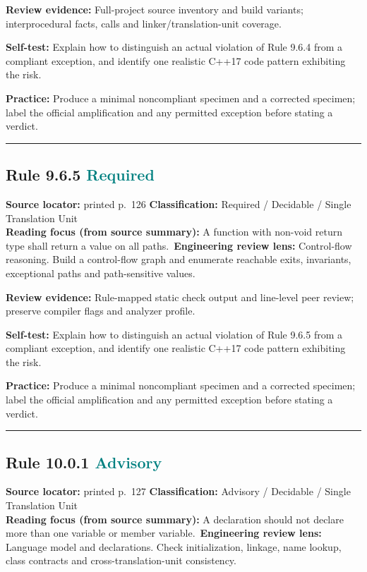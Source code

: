 \documentclass[10pt,letterpaper]{article}
\begin{document}
\textbf{Review evidence:} Full-project source inventory and build variants; interprocedural facts, calls and linker/translation-unit coverage.

\textbf{Self-test:} Explain how to distinguish an actual violation of Rule 9.6.4 from a compliant exception, and identify one realistic C++17 code pattern exhibiting the risk.\par
\textbf{Practice:} Produce a minimal noncompliant specimen and a corrected specimen; label the official amplification and any permitted exception before stating a verdict.
\smallskip\hrule\smallskip
\subsection*{Rule 9.6.5 \enspace \texorpdfstring{\small\textcolor{teal}{Required}}{Required}}
\noindent\textbf{Source locator:} printed p.~126 \quad\textbf{Classification:} Required / Decidable / Single Translation Unit\\
\textbf{Reading focus (from source summary):} A function with non-void return type shall return a value on all paths.\
\textbf{Engineering review lens:} Control-flow reasoning. Build a control-flow graph and enumerate reachable exits, invariants, exceptional paths and path-sensitive values.

\textbf{Review evidence:} Rule-mapped static check output and line-level peer review; preserve compiler flags and analyzer profile.

\textbf{Self-test:} Explain how to distinguish an actual violation of Rule 9.6.5 from a compliant exception, and identify one realistic C++17 code pattern exhibiting the risk.\par
\textbf{Practice:} Produce a minimal noncompliant specimen and a corrected specimen; label the official amplification and any permitted exception before stating a verdict.
\smallskip\hrule\smallskip
\subsection*{Rule 10.0.1 \enspace \texorpdfstring{\small\textcolor{teal}{Advisory}}{Advisory}}
\noindent\textbf{Source locator:} printed p.~127 \quad\textbf{Classification:} Advisory / Decidable / Single Translation Unit\\
\textbf{Reading focus (from source summary):} A declaration should not declare more than one variable or member variable.\
\textbf{Engineering review lens:} Language model and declarations. Check initialization, linkage, name lookup, class contracts and cross-translation-unit consistency.
\end{document}
